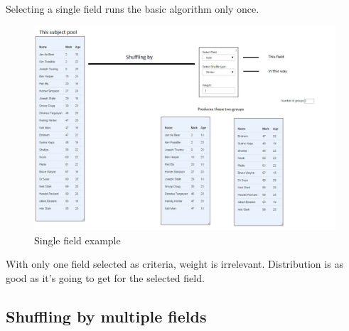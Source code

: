 Selecting a single field runs the basic algorithm only once.\par
 \begin{figure}[H] 
	\centering
	\includegraphics[width=16cm]{./graphics/singleField.jpg}\par
	\caption{Single field example}
\end{figure}

With only one field selected as criteria, weight is irrelevant. Distribution is as good as it's going to get for the selected field.

\subsection{Shuffling by multiple fields}\par

